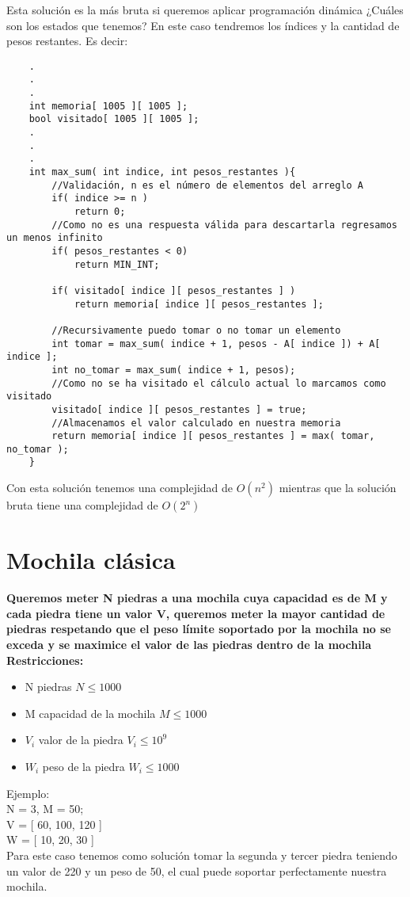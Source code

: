 Esta solución es la más bruta si queremos aplicar programación dinámica ¿Cuáles son los estados que tenemos? En este caso tendremos los índices y la cantidad de pesos restantes. Es decir:
\begin{lstlisting}
    .
    .
    .
    int memoria[ 1005 ][ 1005 ];
    bool visitado[ 1005 ][ 1005 ];
    .
    .
    .
    int max_sum( int indice, int pesos_restantes ){
        //Validación, n es el número de elementos del arreglo A
        if( indice >= n )
            return 0;
        //Como no es una respuesta válida para descartarla regresamos un menos infinito
        if( pesos_restantes < 0)
            return MIN_INT;

        if( visitado[ indice ][ pesos_restantes ] )
            return memoria[ indice ][ pesos_restantes ];
        
        //Recursivamente puedo tomar o no tomar un elemento
        int tomar = max_sum( indice + 1, pesos - A[ indice ]) + A[ indice ];
        int no_tomar = max_sum( indice + 1, pesos);
        //Como no se ha visitado el cálculo actual lo marcamos como visitado
        visitado[ indice ][ pesos_restantes ] = true;
        //Almacenamos el valor calculado en nuestra memoria
        return memoria[ indice ][ pesos_restantes ] = max( tomar, no_tomar );
    }
\end{lstlisting}

Con esta solución tenemos una complejidad de $O(n^{2})$ mientras que la solución bruta tiene una complejidad de $O(2^{n})$

\section{Mochila clásica}
\textbf{Queremos meter N piedras a una mochila cuya capacidad es de M y cada piedra tiene un valor V, queremos meter la mayor cantidad de piedras respetando que el peso límite soportado por la mochila no se exceda y se maximice el valor de las piedras dentro de la mochila\\}
\textbf{Restricciones:}
\begin{itemize}
    \item N piedras $N \leq 1000$
    \item M capacidad de la mochila $M \leq 1000$
    \item $V_{i}$ valor de la piedra $ V_{i} \leq 10^{9}$
    \item $W_{i}$ peso de la piedra $W_{i} \leq 1000$
\end{itemize}
Ejemplo:\\
N = 3, M = 50;\\
V = [ 60, 100, 120 ]\\
W = [ 10, 20, 30 ]\\
Para este caso tenemos como solución tomar la segunda y tercer piedra teniendo un valor de 220 y un peso de 50, el cual puede soportar perfectamente nuestra mochila.\\

